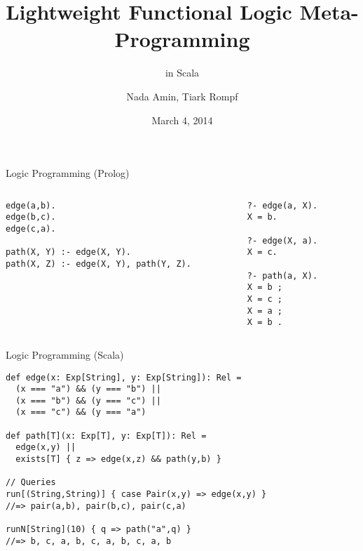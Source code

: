 \documentclass{beamer}
\title{Lightweight Functional Logic Meta-Programming}
\subtitle{in Scala}
\author{Nada Amin, Tiark Rompf}
\institute{LAMP, EPFL}
\date{March 4, 2014}
\begin{document}
\frame{\titlepage}

\begin{frame}[fragile]{Logic Programming (Prolog)}
\begin{columns}
\begin{column}[t]{8cm}
\begin{verbatim}
edge(a,b).
edge(b,c).
edge(c,a).

path(X, Y) :- edge(X, Y).
path(X, Z) :- edge(X, Y), path(Y, Z).
\end{verbatim}
\end{column}
\begin{column}[t]{4cm}
\begin{verbatim}
?- edge(a, X).
X = b.

?- edge(X, a).
X = c.

?- path(a, X).
X = b ;
X = c ;
X = a ;
X = b .
\end{verbatim}
\end{column}
\end{columns}
\end{frame}

\begin{frame}[fragile]{Logic Programming (Scala)}
\begin{verbatim}
def edge(x: Exp[String], y: Exp[String]): Rel =
  (x === "a") && (y === "b") ||
  (x === "b") && (y === "c") ||
  (x === "c") && (y === "a")

def path[T](x: Exp[T], y: Exp[T]): Rel =
  edge(x,y) ||
  exists[T] { z => edge(x,z) && path(y,b) }

// Queries
run[(String,String)] { case Pair(x,y) => edge(x,y) }
//=> pair(a,b), pair(b,c), pair(c,a)

runN[String](10) { q => path("a",q) }
//=> b, c, a, b, c, a, b, c, a, b
\end{verbatim}
\end{frame}
\end{document}
